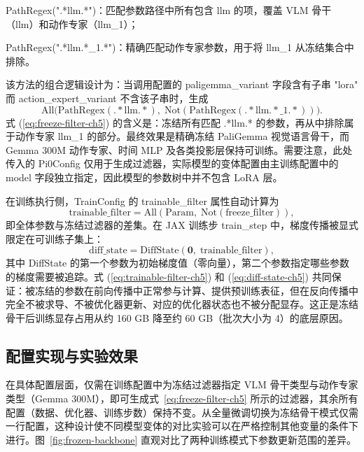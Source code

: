 PathRegex(".*llm.*")：匹配参数路径中所有包含 llm 的项，覆盖 VLM 骨干（llm）和动作专家（llm\_1）；

PathRegex(".*llm.*\_1.*")：精确匹配动作专家参数，用于将 llm\_1 从冻结集合中排除。

该方法的组合逻辑设计为：当调用配置的 paligemma\_variant 字段含有子串 "lora" 而 action\_expert\_variant 不含该子串时，生成
\begin{equation}
  \mathrm{All}\big(\mathrm{PathRegex}(\mathrm{.*llm.*}),\;
  \mathrm{Not}(\mathrm{PathRegex}(\mathrm{.*llm.*\_1.*}))\big).
  \label{eq:freeze-filter-ch5}
\end{equation}
式 (\ref{eq:freeze-filter-ch5}) 的含义是：冻结所有匹配 .*llm.* 的参数，再从中排除属于动作专家 llm\_1 的部分。最终效果是精确冻结 PaliGemma 视觉语言骨干，而 Gemma 300M 动作专家、时间 MLP 及各类投影层保持可训练。需要注意，此处传入的 Pi0Config 仅用于生成过滤器，实际模型的变体配置由主训练配置中的 model 字段独立指定，因此模型的参数树中并不包含 LoRA 层。

在训练执行侧，TrainConfig 的 trainable\_filter 属性自动计算为
\begin{equation}
  \mathrm{trainable\_filter} = \mathrm{All}(\mathrm{Param},\; \mathrm{Not}(\mathrm{freeze\_filter})),
  \label{eq:trainable-filter-ch5}
\end{equation}
即全体参数与冻结过滤器的差集。在 JAX 训练步 train\_step 中，梯度传播被显式限定在可训练子集上：
\begin{equation}
  \mathrm{diff\_state} = \mathrm{DiffState}(\mathbf{0},\; \mathrm{trainable\_filter}),
  \label{eq:diff-state-ch5}
\end{equation}
其中 DiffState 的第一个参数为初始梯度值（零向量），第二个参数指定哪些参数的梯度需要被追踪。式 (\ref{eq:trainable-filter-ch5}) 和 (\ref{eq:diff-state-ch5}) 共同保证：被冻结的参数在前向传播中正常参与计算、提供预训练表征，但在反向传播中完全不被求导、不被优化器更新、对应的优化器状态也不被分配显存。这正是冻结骨干后训练显存占用从约 160 GB 降至约 60 GB（批次大小为 4）的底层原因。

\subsection{配置实现与实验效果}

在具体配置层面，仅需在训练配置中为冻结过滤器指定 VLM 骨干类型与动作专家类型（Gemma 300M），即可生成式~\eqref{eq:freeze-filter-ch5} 所示的过滤器，其余所有配置（数据、优化器、训练步数）保持不变。从全量微调切换为冻结骨干模式仅需一行配置，这种设计使不同模型变体的对比实验可以在严格控制其他变量的条件下进行。图~\ref{fig:frozen-backbone} 直观对比了两种训练模式下参数更新范围的差异。

